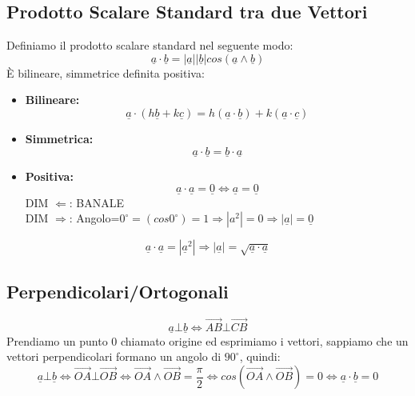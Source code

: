 \subsection{Prodotto Scalare Standard tra due Vettori}
Definiamo il prodotto scalare standard nel seguente modo:
$$ \underline{a} \cdot \underline{b} = |\underline{a}||\underline{b}|cos(\underline{a} \wedge \underline{b}) $$
È bilineare, simmetrice definita positiva:
\begin{itemize}

\item[]\textbf{Bilineare:}\\
$$ \underline{a} \cdot (h\underline{b}+k\underline{c}) = h(\underline{a} \cdot \underline{b}) + k (\underline{a} \cdot \underline{c}) $$

\item[]\textbf{Simmetrica:}\\
$$ \underline{a} \cdot \underline{b} = \underline{b} \cdot \underline{a} $$

\item[]\textbf{Positiva:}\\
$$ \underline{a} \cdot \underline{a} = \underline{0} \Leftrightarrow \underline{a} = \underline{0} $$
DIM $\Leftarrow$: BANALE\\
DIM $\Rightarrow$: Angolo=$0^{\circ}=(cos 0^{\circ}) = 1 \Rightarrow |a^2| = 0 \Rightarrow |\underline{a}| = \underline{0}$

\end{itemize}
$$\underline{a} \cdot \underline{a} = |\underline{a}^2| \Rightarrow |\underline{a}| = \sqrt{\underline{a} \cdot \underline{a}}$$

\subsection{Perpendicolari/Ortogonali}
$$ \underline{a} \bot \underline{b} \Leftrightarrow \vec{AB} \bot \vec{CB} $$
Prendiamo un punto $0$ chiamato origine ed esprimiamo i vettori, sappiamo che un vettori perpendicolari formano un angolo di $90^{\circ}$, quindi:
$$ \underline{a} \bot \underline{b} \Leftrightarrow \vec{OA} \bot \vec{OB} \Leftrightarrow \vec{OA} \wedge \vec{OB} = \frac{\pi}{2} \Leftrightarrow cos(\vec{OA} \wedge \vec{OB}) = 0 \Leftrightarrow \underline{a} \cdot \underline{b} = 0 $$

